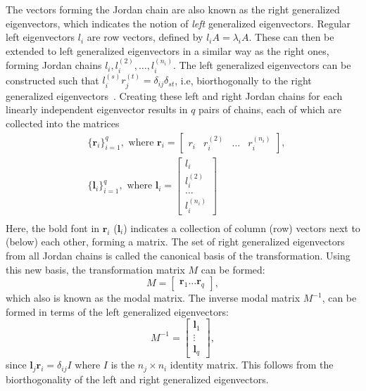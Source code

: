 \documentclass[../main.tex]{subfiles}
\begin{document}
The vectors forming the Jordan chain are also known as the right generalized eigenvectors, which indicates the notion of \textit{left} generalized eigenvectors. Regular left eigenvectors $l_i$ are row vectors, defined by $l_iA = \lambda_iA$. These can then be extended to left generalized eigenvectors in a similar way as the right ones, forming Jordan chains $l_i, l_i^{(2)}, \dots, l_i^{(n_i)}$. The left generalized eigenvectors can be constructed such that $l_i^{(s)}r_j^{(t)}=\delta_{ij}\delta_{st}$, i.e, biorthogonally to the right generalized eigenvectors~\cite{nonHermrev}. Creating these left and right Jordan chains for each linearly independent eigenvector results in $q$ pairs of chains, each of which are collected into the matrices
\begin{equation}
    \begin{aligned}
        &\{\boldsymbol{r}_i\}_{i=1}^q, \text{ where }\boldsymbol{r}_i = \begin{bmatrix}r_i&r_i^{(2)}&\dots &r_i^{(n_i)}\end{bmatrix},\\
        &\{\boldsymbol{l}_i\}_{i=1}^q, \text{ where }\boldsymbol{l}_i = \begin{bmatrix}l_i\\ l_i^{(2)}\\\dots \\ l_i^{(n_i)}\end{bmatrix}\\
    \end{aligned}
\end{equation}
Here, the bold font in $\boldsymbol{r}_i$ ($\boldsymbol{l}_i$) indicates a collection of column (row) vectors next to (below) each other, forming a matrix. The set of right generalized eigenvectors from all Jordan chains is called the canonical basis of the transformation. Using this new basis, the transformation matrix $M$ can be formed:
\begin{equation}\label{chofba}
    M = \begin{bmatrix}\boldsymbol{r}_1 \dots \boldsymbol{r}_q\end{bmatrix},
\end{equation}
which also is known as the modal matrix. The inverse modal matrix $M^{-1}$, can be formed in terms of the left generalized eigenvectors: 
\begin{equation}\label{chofbaleft}
    M^{-1} = \begin{bmatrix}\boldsymbol{l}_1\\ \vdots \\ \boldsymbol{l}_q\end{bmatrix},
\end{equation}
since $\boldsymbol{l}_j \boldsymbol{r}_i = \delta_{ij}I$ where $I$ is the $n_j\times n_i$ identity matrix. This follows from the biorthogonality of the left and right generalized eigenvectors.
\end{document}
